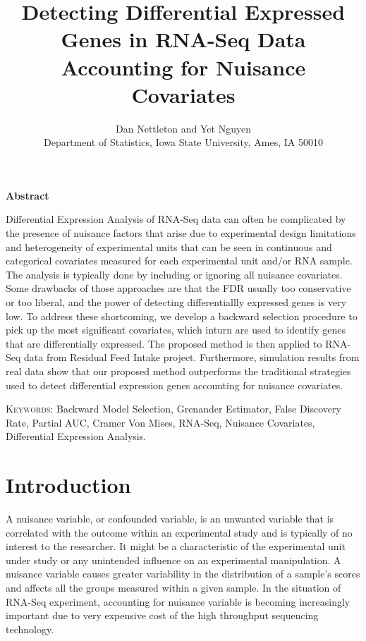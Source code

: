 \documentclass[12pt, letter]{article}\usepackage[]{graphicx}\usepackage[]{color}
\begin{document}
\title{\bf Detecting Differential Expressed Genes in RNA-Seq Data
Accounting for Nuisance Covariates}
\author{Dan Nettleton  and Yet Nguyen\\
Department of Statistics, 
Iowa State University, Ames, IA 50010%
}

\maketitle



\begin{center}
\textbf{Abstract}
\end{center}
Differential Expression Analysis of RNA-Seq data can often be complicated by the presence of nuisance factors that arise due to experimental design limitations and heterogeneity of experimental units that can be seen in continuous and categorical covariates measured for each experimental unit and/or RNA sample. The analysis is typically done by including or ignoring all nuisance covariates. Some drawbacks of those approaches are that the FDR usually too conservative or too liberal, and the power of detecting differentiallly expressed genes is very low. To address these shortcoming, we develop a backward selection procedure to pick up the most significant covariates, which inturn are used to identify  genes that are differentially expressed. The proposed method is then applied to RNA-Seq data from Residual Feed Intake project. Furthermore, simulation results from real data show that our proposed method outperforms the traditional strategies used to detect differential expression genes accounting for nuisance covariates.



\vspace*{.3in}

\noindent\textsc{Keywords}: {Backward Model Selection, Grenander Estimator,  False Discovery Rate, Partial AUC, Cramer Von Mises, RNA-Seq, Nuisance Covariates, Differential Expression Analysis.}


\section{\bf Introduction}
A nuisance variable, or confounded variable, is an unwanted variable that is correlated with the outcome within an experimental study and is typically of no interest to the researcher. It might be a characteristic of the experimental unit under study or any unintended influence on an experimental manipulation. A nuisance variable causes greater variability in the distribution of a sample's scores and affects all the groups measured within a given sample. In the situation of RNA-Seq experiment, accounting for nuisance variable is becoming increasingly important due to very expensive cost of the high throughput sequencing technology.
\end{document}
